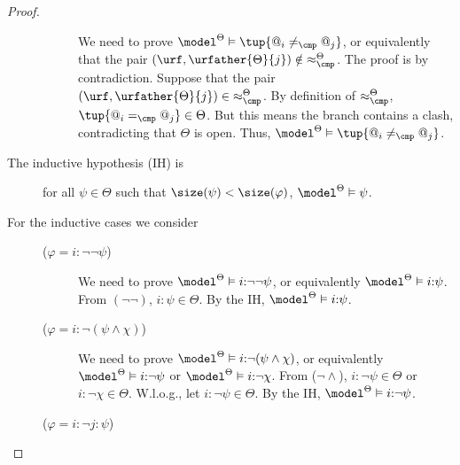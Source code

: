 \documentclass[10pt,a4paper]{amsart}
\theoremstyle{definition}
\theoremstyle{remark}
\begin{document}
\begin{proof}
\begin{description}
\begin{description}
                    We need to prove $\model^\Theta \vDash \tup{@_i \neq_{\cmp} @_j}$, or equivalently that the pair ${(\urf, \urfather{\Theta}{j})} \notin {\approx^{\Theta}_{\cmp}}$.
                    The proof is by contradiction.
                    Suppose that the pair ${(\urf, \urfather{\Theta}{j})} \in {\approx^{\Theta}_{\cmp}}$.
                    By definition of ${\approx^{\Theta}_{\cmp}}$, $\tup{@_i =_{\cmp} @_j} \in \Theta$.
                    But this means the branch contains a clash, contradicting that $\Theta$ is open. Thus, $\model^\Theta \vDash \tup{@_i \neq_{\cmp} @_j}$. 
            \end{description}
        \item[\textnormal{The inductive hypothesis (IH) is}] for all $\psi \in \Theta$ such that $\size(\psi) < \size(\varphi)$,  $\model^\Theta \vDash \psi$.
        \item[\textnormal{For the inductive cases we consider}] \hfill
        \begin{description}
            \item[($\varphi = i{:}\lnot\lnot \psi$)]
                We need to prove $\model^{\Theta} \vDash i{:}\lnot\lnot\psi$, or equivalently
                    $\model^{\Theta} \vDash i{:}\psi$.
                From $(\lnot\lnot)$, ${i{:}\psi \in \Theta}$.
                By the IH, $\model^{\Theta} \vDash i{:}\psi$.
            \item[($\varphi = i{:}\lnot (\psi \land \chi)$)]
                We need to prove $\model^{\Theta} \vDash i{:}\lnot(\psi \land \chi)$, or equivalently
                    $\model^{\Theta} \vDash i{:}\lnot\psi$ or
                    $\model^{\Theta} \vDash i{:}\lnot\chi$.
                From ($\lnot\land$), $i{:}\lnot\psi \in \Theta$ or $i{:}\lnot\chi \in \Theta$.
                W.l.o.g., let $i{:}\lnot\psi \in \Theta$. By the IH, $\model^{\Theta} \vDash i{:}\lnot\psi$.
            \item[($\varphi = i{:}\lnot j{:}\psi$)]

\end{description}
\end{description}
\end{proof}
\end{document}
